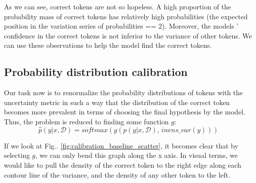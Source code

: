 \documentclass[a4paper,14pt]{extarticle}
\begin{document}
	As we can see, correct tokens are not so hopeless. A high proportion of the probability mass of correct tokens has relatively high probabilities (the expected position in the variation series of probabilities == 2). Moreover, the models ' confidence in the correct tokens is not inferior to the variance of other tokens. We can use these observations to help the model find the correct tokens.
	
\subsection{Probability distribution calibration}
	Our task now is to renormalize the probability distributions of tokens with the uncertainty metric in such a way that the distribution of the correct token becomes more prevalent in terms of choosing the final hypothesis by the model. Thus, the problem is reduced to finding some function $g$:
	\begin{equation*}
		\hat{p}(y | x, \mathcal{D}) = softmax(g(p(y | x, \mathcal{D}),\, inens\_var(y)))
	\end{equation*}
	
	\begin{figure}[t]
	\end{figure} 
	
	If we look at Fig.. \ref{fig:calibration_baseline_scatter}, it becomes clear that by selecting $g$, we can only bend this graph along the x axis. In visual terms, we would like to pull the density of the correct token to the right edge along each contour line of the variance, and the density of any other token to the left.
	
\end{document}
